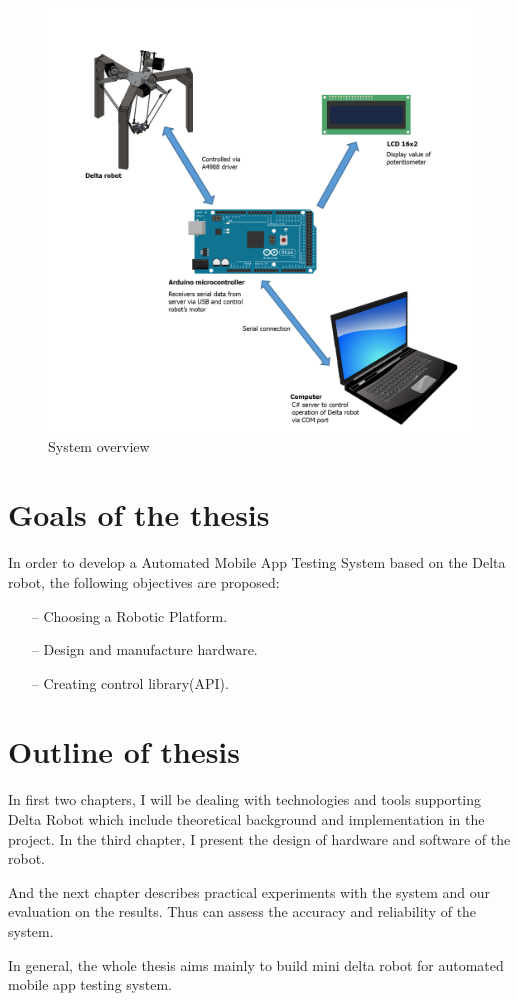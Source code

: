 \begin{figure}[H]
	\centering
	\includegraphics[width=\maxwidth{17cm}, keepaspectratio]{Chapters/Fig/system_overview.png}
	\caption{System overview}
	\label{fig:system_overview}
\end{figure}

\section{Goals of the thesis}
In order to develop a Automated Mobile App Testing System based on the Delta robot, the following objectives are proposed:
	\begin{itemize}
		\item[--] Choosing a Robotic Platform.
		\item[--] Design and manufacture hardware.
		\item[--] Creating control library(API).
	\end{itemize}

\section{Outline of thesis}

In first two chapters, I will be dealing with technologies and tools supporting Delta Robot which include theoretical background and implementation in the project.
In the third chapter, I present the design of hardware and software of the robot.

And the next chapter describes practical experiments with the system and our evaluation on the results. Thus can assess the accuracy and reliability of the system.

In general, the whole thesis aims mainly to build mini delta robot for automated mobile app testing system. \nocite{radim_thesis}